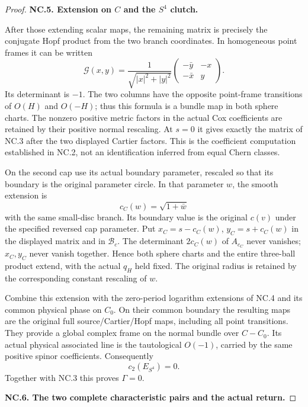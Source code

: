 \begin{proof}
\par\medskip\noindent\textbf{NC.5. Extension on \(C\) and the \(S^4\) clutch.}\par\nopagebreak[4]

After those extending scalar maps, the remaining matrix is precisely the conjugate Hopf product from the two branch coordinates. In homogeneous point frames it can be written
\[
 \mathcal G(x,y)=
 \frac1{\sqrt{|x|^2+|y|^2}}
 \begin{pmatrix}-\bar y&-x\\-\bar x&y\end{pmatrix}.
\]
Its determinant is \(-1\). The two columns have the opposite point-frame transitions of \(O(H)\) and \(O(-H)\); thus this formula is a bundle map in both sphere charts. The nonzero positive metric factors in the actual Cox coefficients are retained by their positive normal rescaling. At \(s=0\) it gives exactly the matrix of NC.3 after the two displayed Cartier factors. This is the coefficient computation established in NC.2, not an identification inferred from equal Chern classes.

On the second cap use its actual boundary parameter, rescaled so that its boundary is the original parameter circle. In that parameter \(w\), the smooth extension is
\[
 c_C(w)=\sqrt{1+\bar w}
\]
with the same small-disc branch. Its boundary value is the original \(c(v)\) under the specified reversed cap parameter. Put \(x_C=s-c_C(w)\), \(y_C=s+c_C(w)\) in the displayed matrix and in \(\mathcal B_c\). The determinant \(2c_C(w)\) of \(A_{c_C}\) never vanishes; \(x_C,y_C\) never vanish together. Hence both sphere charts and the entire three-ball product extend, with the actual \(q_H\) held fixed. The original radius is retained by the corresponding constant rescaling of \(w\).

Combine this extension with the zero-period logarithm extensions of NC.4 and its common physical phase on \(C_0\). On their common boundary the resulting maps are the original full source/Cartier/Hopf maps, including all point transitions. They provide a global complex frame on the normal bundle over \(C-C_0\). Its actual physical associated line is the tautological \(O(-1)\), carried by the same positive spinor coefficients. Consequently
\[
 c_2(E_{S^4})=0.
\]
Together with NC.3 this proves \(\Gamma=0\).

\par\medskip\noindent\textbf{NC.6. The two complete characteristic pairs and the actual return.}\par\nopagebreak[4]


\end{proof}
